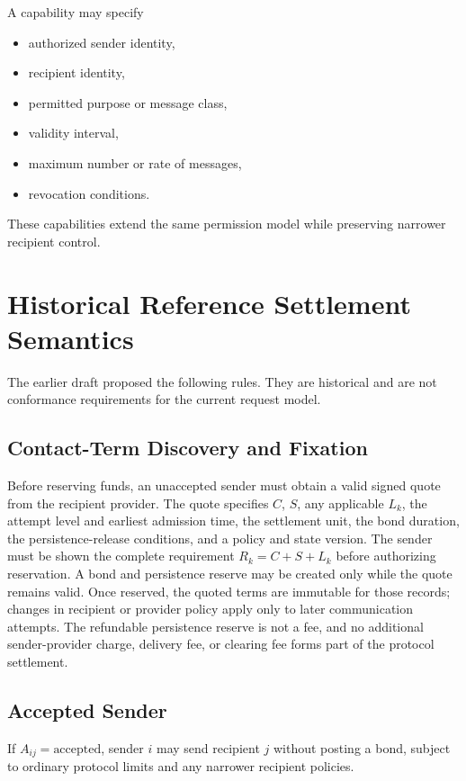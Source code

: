 \documentclass[11pt]{article}
\begin{document}
A capability may specify

\begin{itemize}[leftmargin=2em]
    \item authorized sender identity,
    \item recipient identity,
    \item permitted purpose or message class,
    \item validity interval,
    \item maximum number or rate of messages,
    \item revocation conditions.
\end{itemize}

These capabilities extend the same permission model while preserving narrower recipient control.

\section{Historical Reference Settlement Semantics}

The earlier draft proposed the following rules. They are historical and are
not conformance requirements for the current request model.

\subsection*{Contact-Term Discovery and Fixation}

Before reserving funds, an unaccepted sender must obtain a valid signed quote from the recipient provider. The quote specifies $C$, $S$, any applicable $L_k$, the attempt level and earliest admission time, the settlement unit, the bond duration, the persistence-release conditions, and a policy and state version. The sender must be shown the complete requirement $R_k=C+S+L_k$ before authorizing reservation. A bond and persistence reserve may be created only while the quote remains valid. Once reserved, the quoted terms are immutable for those records; changes in recipient or provider policy apply only to later communication attempts. The refundable persistence reserve is not a fee, and no additional sender-provider charge, delivery fee, or clearing fee forms part of the protocol settlement.

\subsection*{Accepted Sender}

If $A_{ij}=\text{accepted}$, sender $i$ may send recipient $j$ without posting a bond, subject to ordinary protocol limits and any narrower recipient policies.
\end{document}
